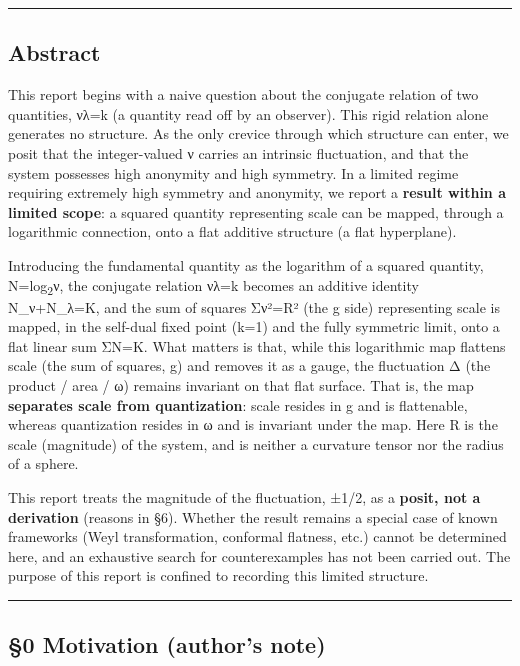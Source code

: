 \documentclass[11pt]{ltjsarticle}
\begin{document}
\begin{center}\rule{0.5\linewidth}{0.5pt}\end{center}

\subsection{Abstract}\label{abstract}

This report begins with a naive question about the conjugate relation of
two quantities, νλ=k (a quantity read off by an observer). This rigid
relation alone generates no structure. As the only crevice through which
structure can enter, we posit that the integer-valued ν carries an
intrinsic fluctuation, and that the system possesses high anonymity and
high symmetry. In a limited regime requiring extremely high symmetry and
anonymity, we report a \textbf{result within a limited scope}: a squared
quantity representing scale can be mapped, through a logarithmic
connection, onto a flat additive structure (a flat hyperplane).

Introducing the fundamental quantity as the logarithm of a squared
quantity, N=log\textsubscript{2}ν, the conjugate relation νλ=k becomes an additive
identity N\_ν+N\_λ=K, and the sum of squares Σν²=R² (the g side)
representing scale is mapped, in the self-dual fixed point (k=1) and the
fully symmetric limit, onto a flat linear sum ΣN=K. What matters is
that, while this logarithmic map flattens scale (the sum of squares, g)
and removes it as a gauge, the fluctuation Δ (the product / area / ω)
remains invariant on that flat surface. That is, the map
\textbf{separates scale from quantization}: scale resides in g and is
flattenable, whereas quantization resides in ω and is invariant under
the map. Here R is the scale (magnitude) of the system, and is neither a
curvature tensor nor the radius of a sphere.

This report treats the magnitude of the fluctuation, ±1/2, as a
\textbf{posit, not a derivation} (reasons in §6). Whether the result
remains a special case of known frameworks (Weyl transformation,
conformal flatness, etc.) cannot be determined here, and an exhaustive
search for counterexamples has not been carried out. The purpose of this
report is confined to recording this limited structure.

\begin{center}\rule{0.5\linewidth}{0.5pt}\end{center}

\subsection{§0 Motivation (author's
note)}\label{motivation-authors-note}
\end{document}
